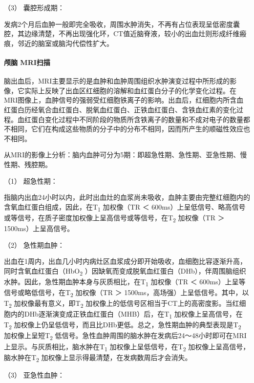 \hypertarget{text00243.htmlux5cux23CHP8-1-3-2-2-1-3}{}
（3） 囊腔形成期：

发病2个月后血肿一般即完全吸收，周围水肿消失，不再有占位表现呈低密度囊腔，其边缘清楚，不再出现强化环，CT值近脑脊液，较小的出血灶则形成纤维瘢痕，邻近的脑室或脑沟代偿性扩大。

\paragraph{颅脑 MRI扫描}

脑出血后，MRI主要显示的是血肿和血肿周围组织水肿演变过程中所形成的影像，它实际上反映了出血区红细胞的溶解和血红蛋白分子的化学变化过程。在MRI图像上，血肿信号的强弱受红细胞铁离子的影响。出血后，红细胞内所含血红蛋白历经氧合血红蛋白、脱氧血红蛋白、正铁血红蛋白、含铁血红素的变化过程。血红蛋白变化过程中不同阶段的物质所含铁离子的数量和不成对电子的数量都不相同，它们在构成这些物质的分子中的分布不相同，因而所产生的顺磁性效应也不相同。

从MRI的影像上分析：脑内血肿可分为5期：即超急性期、急性期、亚急性期、慢性期、残腔期。

\hypertarget{text00243.htmlux5cux23CHP8-1-3-2-2-2-1}{}
（1） 超急性期：

指脑内出血24小时以内，此时出血灶的血浆尚未吸收，血肿主要由完整红细胞内的含氧血红蛋白组成，因此，在T\textsubscript{1}
加权像（TR ＜
600ms）上呈低信号、略高信号或等信号，在质子密度加权像上呈高信号或等信号，在T\textsubscript{2}
加权像（TR ＞ 1500ms）上呈高信号。

\hypertarget{text00243.htmlux5cux23CHP8-1-3-2-2-2-2}{}
（2） 急性期血肿：

出血在1周内，出血几小时内病灶区血浆成分即开始吸收，血细胞比容逐渐升高，同时含氧血红蛋白（HbO\textsubscript{2}
）因缺氧而变成脱氧血红蛋白（DHb），伴周围脑组织水肿。因此，急性期血肿本身与灰质相比，在T\textsubscript{1}
加权像（TR ＜ 600ms）上呈等信号或略低信号，在T\textsubscript{2}
加权像（TR ＞ 1500ms，高场强）上呈低信号。其中，以T\textsubscript{2}
加权像最有意义，即T\textsubscript{2}
加权像上的低信号区相当于CT上的高密度影。当红细胞内的DHb逐渐演变成正铁血红蛋白（MHB）后，在T\textsubscript{1}
加权像上呈高信号，在T\textsubscript{2}
加权像上仍呈低信号，而且比DHb更低。总之，急性期血肿的典型表现是T\textsubscript{2}
加权像上呈短T\textsubscript{2}
低信号。急性血肿周围的脑水肿在发病后24～48小时即可在MRI上显示。与灰质相比，脑水肿在T\textsubscript{1}
加权像上呈低信号，在T\textsubscript{2}
加权像上呈高信号，脑水肿在T\textsubscript{2}
加权像上显示得最清楚，在发病数周后才会消失。

\hypertarget{text00243.htmlux5cux23CHP8-1-3-2-2-2-3}{}
（3） 亚急性血肿：

